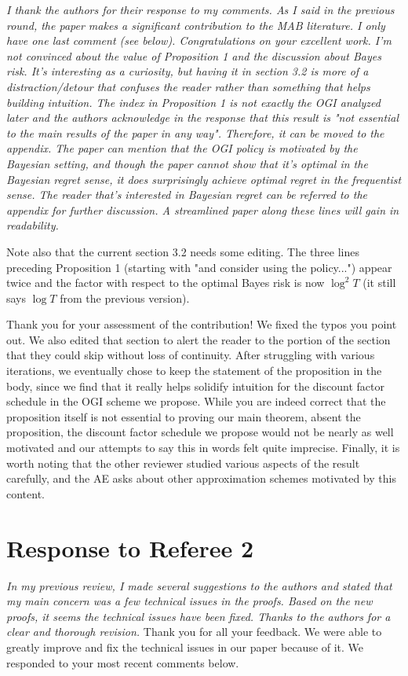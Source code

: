 \documentclass[11pt]{article}
\newcommand{\1}{\ensuremath{\mathbf{1}}} %
\theoremstyle{thm-sf}
\begin{document}
	{\it I thank the authors for their response to my comments. As I said in the previous round, the paper makes a significant contribution to the MAB literature. I only have one last comment (see below). Congratulations on your excellent work.
		I'm not convinced about the value of Proposition 1 and the discussion about Bayes risk. It's interesting as a curiosity, but having it in section 3.2 is more of a distraction/detour that confuses the reader rather than something that helps building intuition. The index in Proposition 1 is not exactly the OGI analyzed later and the authors acknowledge in the response that this result is "not essential to the main results of the paper in any way". Therefore, it can be moved to the appendix. The paper can mention that the OGI policy is motivated by the Bayesian setting, and though the paper cannot show that it's optimal in the Bayesian regret sense, it does surprisingly achieve optimal regret in the frequentist sense. The reader that's interested in Bayesian regret can be referred to the appendix for further discussion. A streamlined paper along these lines will gain in readability.
		
Note also that the current section 3.2 needs some editing. The three lines preceding Proposition 1 (starting with "and consider using the policy...") appear twice and the factor with respect to the optimal Bayes risk is now $\log^2 T$ (it still says $\log T$ from the previous version).	
}
\newline
\newline
\noindent
Thank you for your assessment of the contribution! We fixed the typos you point out. We also edited that section to alert the reader to the portion of the section that they could skip without loss of continuity. After struggling with various iterations, we eventually chose to keep the statement of the proposition in the body, since we find that it really helps solidify intuition for the discount factor schedule in the OGI scheme we propose. While you are indeed correct that the proposition itself is not essential to proving our main theorem, absent the proposition, the discount factor schedule we propose would not be nearly as well motivated and our attempts to say this in words felt quite imprecise. Finally, it is worth noting that the other reviewer studied various aspects of the result carefully, and the AE asks about other approximation schemes motivated by this content. 
	
	\newpage
	\section{Response to Referee 2}
	{
	\it 
	In my previous review, I made several suggestions to the authors and stated that my main concern was a few technical issues in the proofs. Based on the new proofs, it seems the technical issues have been fixed. Thanks to the authors for a clear and thorough revision.
	}
    \newline
    \newline
    Thank you for all your feedback. We were able to greatly improve and fix the technical issues in our paper because of it. We responded to your most recent comments below.
\end{document}

